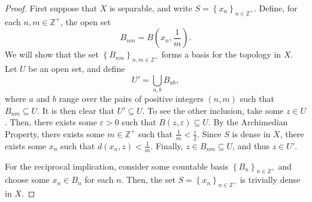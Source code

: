 \begin{proof}
		First suppose that \(X\) is separable, and write \(S=\left\{x_n\right\}_{n\in\mathbb{Z}^{+}}\). Define, for each \(n,m\in\mathbb{Z}^{+}\), the open set
		\[
				B_{nm}=B\left(x_n,\frac{1}{m}\right)
		.\]
		We will show that the set \(\left\{B_{nm}\right\}_{n,m\in\mathbb{Z}^{+}}\) forms a basis for the topology in \(X\). Let \(U\) be an open set, and define
		\[
				U'=\bigcup_{a,b}B_{ab}
		,\]
		where \(a\) and \(b\) range over the pairs of positive integers \((n,m)\) such that \(B_{nm}\subseteq U\). It is then clear that \(U'\subseteq U\). To see the other inclusion, take some \(z\in U\). Then, there exists some \(\varepsilon>0\) such that \(B(z,\varepsilon)\subseteq U\). By the Archimedian Property, there exists some \(m\in\mathbb{Z}^+\) such that \(\frac{1}{m}<\frac{\varepsilon}{2}\). Since \(S\) is dense in \(X\), there exists some \(x_n\) such that \(d(x_n,z)<\frac{1}{m}\). Finally, \(z\in B_{nm}\subseteq U\), and thus \(z\in U'\).

		For the reciprocal implication, consider some countable basis \(\left\{B_n\right\}_{n\in\mathbb{Z}^+}\) and choose some \(x_n\in B_n\) for each \(n\). Then, the set \(S=\left\{x_n\right\}_{n\in\mathbb{Z}^+}\) is trivially dense in \(X\).
\end{proof}
